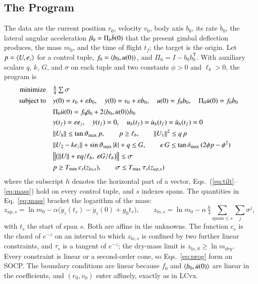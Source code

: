 \subsection{The Program}
The data are the current position $r_0$, velocity $v_0$, body axis $b_0$, its rate $\dot b_0$, the lateral angular acceleration
$\beta_0=\Pi_b\ddot b(0)$ that the present gimbal deflection produces, the mass $m_0$, and the time of flight $t_f$; the target is
the origin. Let $p=\langle U,e_z\rangle$ for a control tuple, $f_0=\langle b_0,u(0)\rangle$, and $\Pi_0=I-b_0b_0^{\mathsf T}$. With auxiliary scalars
$q$, $k$, $G$, and $\sigma$ on each tuple and two constants $\phi>0$ and $\ell_b>0$, the program is
\begin{subequations}\label{eq:prog}
\begin{align}
\text{minimize}\quad & \tfrac h4\textstyle\sum\sigma \label{eq:obj}\\
\text{subject to}\quad & y(0)=r_0+\varepsilon b_0,\quad \dot y(0)=v_0+\varepsilon\dot b_0,\quad u(0)=f_0b_0,\quad \Pi_0\dot u(0)=f_0\dot b_0 \notag\\
& \Pi_0\ddot u(0)=f_0\beta_0+2\langle b_0,\dot u(0)\rangle\dot b_0 \label{eq:bc0}\\
& y(t_f)=\varepsilon e_z,\quad \dot y(t_f)=0,\quad u_h(t_f)=\dot u_h(t_f)=\ddot u_h(t_f)=0 \label{eq:bcf}\\
& \lVert U_h\rVert\le\tan\vartheta_{\max}\,p,\qquad p\ge\ell_b,\qquad \lVert U_1\rVert^2\le q\,p \label{eq:tilt}\\
& \lVert U_2-ke_z\rVert+\sin\vartheta_{\max}\,|k|+q\le G,\qquad \varepsilon\,G\le\tan\delta_{\max}\,(2\phi p-\phi^2) \label{eq:gimbal}\\
& \bigl\|\bigl(\lVert U\rVert+\varepsilon q/\ell_b,\ \varepsilon G/\ell_b\bigr)\bigr\|\le\sigma \label{eq:sigma}\\
& p\ge T_{\min}\,c_s(z_{lo,s}),\qquad \sigma\le T_{\max}\,\tau_s(z_{up,s}) \label{eq:mass}
\end{align}
\end{subequations}
where the subscript $h$ denotes the horizontal part of a vector, Eqs.~(\ref{eq:tilt}--\ref{eq:mass}) hold on every control
tuple, and $s$ indexes spans. The quantities in Eq.~\eqref{eq:mass} bracket the logarithm of the mass:
\begin{equation}\label{eq:z}
z_{up,s}=\ln m_0-\alpha\bigl(\dot y_z(t_s)-\dot y_z(0)+g_0t_s\bigr),\qquad z_{lo,s}=\ln m_0-\alpha\,\tfrac h4\!\!\sum_{\text{spans}\le s}\sum_{j}\sigma^j ,
\end{equation}
with $t_s$ the start of span $s$. Both are affine in the unknowns. The function $c_s$ is the chord of $e^{-z}$ on an interval
to which $z_{lo,s}$ is confined by two further linear constraints, and $\tau_s$ is a tangent of $e^{-z}$; the dry-mass limit is
$z_{lo,S}\ge\ln m_{dry}$. Every constraint is linear or a second-order cone, so Eqs.~\eqref{eq:prog} form an SOCP. The boundary
conditions are linear because $f_0$ and $\langle b_0,\dot u(0)\rangle$ are linear in the coefficients, and $(r_0,v_0)$ enter affinely,
exactly as in LCvx.

